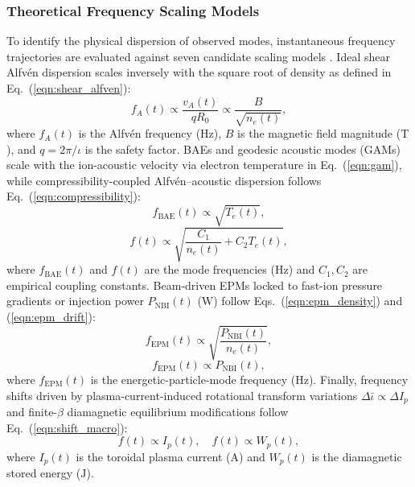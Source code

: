 \subsubsection{Theoretical Frequency Scaling Models}
\label{subsubsec:scaling_models}
To identify the physical dispersion of observed modes, instantaneous frequency trajectories are evaluated against seven candidate scaling models \cite{Varela2024}. Ideal shear Alfv\'en dispersion scales inversely with the square root of density as defined in Eq.~(\ref{eqn:shear_alfven}):
\begin{equation}
\label{eqn:shear_alfven}
f_A(t) \propto \frac{v_A(t)}{q R_0} \propto \frac{B}{\sqrt{n_e(t)}},
\end{equation}
\noindent where $f_A(t)$ is the Alfv\'en frequency ($\mathrm{Hz}$), $B$ is the magnetic field magnitude ($\mathrm{T}$), and $q = 2\pi/\iota$ is the safety factor. BAEs and geodesic acoustic modes (GAMs) scale with the ion-acoustic velocity via electron temperature in Eq.~(\ref{eqn:gam}), while compressibility-coupled Alfv\'en--acoustic dispersion follows Eq.~(\ref{eqn:compressibility}):
\begin{equation}
\label{eqn:gam}
f_{\mathrm{BAE}}(t) \propto \sqrt{T_e(t)},
\end{equation}
\begin{equation}
\label{eqn:compressibility}
f(t) \propto \sqrt{\frac{C_1}{n_e(t)} + C_2 T_e(t)},
\end{equation}
\noindent where $f_{\mathrm{BAE}}(t)$ and $f(t)$ are the mode frequencies ($\mathrm{Hz}$) and $C_1, C_2$ are empirical coupling constants. Beam-driven EPMs locked to fast-ion pressure gradients or injection power $P_{\mathrm{NBI}}(t)$ ($\mathrm{W}$) follow Eqs.~(\ref{eqn:epm_density}) and (\ref{eqn:epm_drift}):
\begin{equation}
\label{eqn:epm_density}
f_{\mathrm{EPM}}(t) \propto \sqrt{\frac{P_{\mathrm{NBI}}(t)}{n_e(t)}},
\end{equation}
\begin{equation}
\label{eqn:epm_drift}
f_{\mathrm{EPM}}(t) \propto P_{\mathrm{NBI}}(t),
\end{equation}
\noindent where $f_{\mathrm{EPM}}(t)$ is the energetic-particle-mode frequency ($\mathrm{Hz}$).
Finally, frequency shifts driven by plasma-current-induced rotational transform variations $\Delta\bar{\iota} \propto \Delta I_p$ and finite-$\beta$ diamagnetic equilibrium modifications follow Eq.~(\ref{eqn:shift_macro}):
\begin{equation}
\label{eqn:shift_macro}
f(t) \propto I_p(t), \quad f(t) \propto W_p(t),
\end{equation}
\noindent where $I_p(t)$ is the toroidal plasma current ($\mathrm{A}$) and $W_p(t)$ is the diamagnetic stored energy ($\mathrm{J}$).

